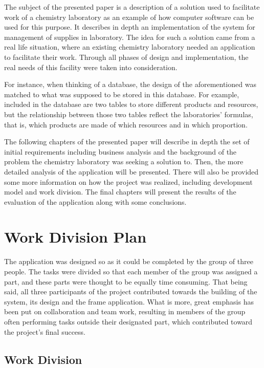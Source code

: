 \documentclass[a4paper,11pt,twoside]{report}
\theoremstyle{definition}
\begin{document}
The subject of the presented paper is a description of a solution used to facilitate work of a chemistry laboratory as an example of how computer software can be used for this purpose.
It describes in depth an implementation of the system for management of supplies in laboratory. The idea for such a solution came from a real life situation, where an existing chemistry laboratory needed an application to facilitate their work. Through all phases of design and implementation, the real needs of this facility were taken into consideration. 

For instance, when thinking of a database, the design of the aforementioned was matched to what was supposed to be stored in this database. For example, included in the database are two tables to store different products and resources, but the relationship between those two tables reflect the laboratories' formulas, that is, which products are made of which resources and in which proportion. 

The following chapters of the presented paper will describe in depth the set of initial requirements including business analysis and the background of the problem the chemistry laboratory was seeking a solution to. Then, the more detailed analysis of the application will be presented. There will also be provided some more information on how the project was realized, including development model and work division. The final chapters will present the results of the evaluation of the application along with some conclusions.





\chapter{Work Division Plan}

The application was designed so as it could be completed by the group of three people. The tasks were divided so that each member of the group was assigned a part, and these parts were thought to be equally time consuming. That being said, all three participants of the project contributed towards the building of the system, its design and the frame application. What is more, great emphasis has been put on collaboration and team work, resulting in members of the group often performing tasks outside their designated part, which contributed toward the project's final success.

\section{Work Division}
\end{document}
